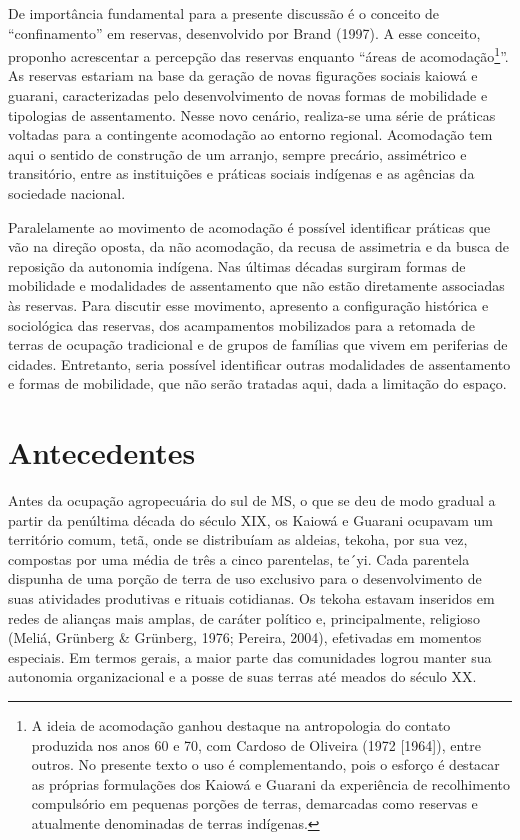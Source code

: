 De importância fundamental para a presente discussão é o conceito de
``confinamento'' em reservas, desenvolvido por Brand (1997). A esse
conceito, proponho acrescentar a percepção das reservas enquanto ``áreas
de acomodação\footnote{A ideia de acomodação ganhou destaque na
antropologia do contato produzida nos anos 60 e 70, com Cardoso de
Oliveira (1972 [1964]), entre outros. No presente texto o uso é
complementando, pois o esforço é destacar as próprias formulações dos
Kaiowá e Guarani da experiência de recolhimento compulsório em pequenas
porções de terras, demarcadas como reservas e atualmente denominadas de
terras indígenas. }''. As reservas estariam na base da geração de novas
figurações sociais kaiowá e guarani, caracterizadas pelo
desenvolvimento de novas formas de mobilidade e tipologias de
assentamento. Nesse novo cenário, realiza-se uma série de práticas
voltadas para a contingente acomodação ao entorno regional. Acomodação
tem aqui o sentido de construção de um arranjo, sempre precário,
assimétrico e transitório, entre as instituições e práticas sociais
indígenas e as agências da sociedade nacional.

Paralelamente ao movimento de acomodação é possível identificar práticas
que vão na direção oposta, da não acomodação, da recusa de assimetria e
da busca de reposição da autonomia indígena. Nas últimas décadas
surgiram formas de mobilidade e modalidades de assentamento que não
estão diretamente associadas às reservas. Para discutir esse movimento,
apresento a configuração histórica e sociológica das reservas, dos
acampamentos mobilizados para a retomada de terras de ocupação
tradicional e de grupos de famílias que vivem em periferias de cidades.
Entretanto, seria possível identificar outras modalidades de
assentamento e formas de mobilidade, que não serão tratadas aqui, dada
a limitação do espaço. 

\section{Antecedentes}

Antes da ocupação agropecuária do sul de MS, o que se deu de modo
gradual a partir da penúltima década do século XIX, os Kaiowá e Guarani
ocupavam um território comum, tetã, onde se distribuíam as aldeias,
tekoha, por sua vez, compostas por uma média de três a cinco
parentelas, te´yi. Cada parentela dispunha de uma porção de terra de
uso exclusivo para o desenvolvimento de suas atividades produtivas e
rituais cotidianas. Os tekoha estavam inseridos em redes de alianças
mais amplas, de caráter político e, principalmente, religioso (Meliá,
Grünberg \& Grünberg, 1976; Pereira, 2004), efetivadas em momentos
especiais. Em termos gerais, a maior parte das comunidades logrou
manter sua autonomia organizacional e a posse de suas terras até meados
do século XX.


